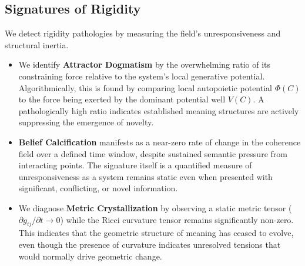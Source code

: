 \subsection{Signatures of Rigidity}
We detect rigidity pathologies by measuring the field's unresponsiveness and structural inertia.
\begin{itemize}
    \item We identify \textbf{Attractor Dogmatism} by the overwhelming ratio of its constraining force relative to the system's local generative potential. Algorithmically, this is found by comparing local autopoietic potential \(\Phi(C)\) to the force being exerted by the dominant potential well \(V(C)\). A pathologically high ratio indicates established meaning structures are actively suppressing the emergence of novelty.
    \item \textbf{Belief Calcification} manifests as a near-zero rate of change in the coherence field over a defined time window, despite sustained semantic pressure from interacting points. The signature itself is a quantified measure of unresponsiveness as a system remains static even when presented with significant, conflicting, or novel information.
    \item We diagnose \textbf{Metric Crystallization} by observing a static metric tensor (\(\partial g_{ij} / \partial t \to 0\)) while the Ricci curvature tensor remains significantly non-zero. This indicates that the geometric structure of meaning has ceased to evolve, even though the presence of curvature indicates unresolved tensions that would normally drive geometric change.
\end{itemize}

